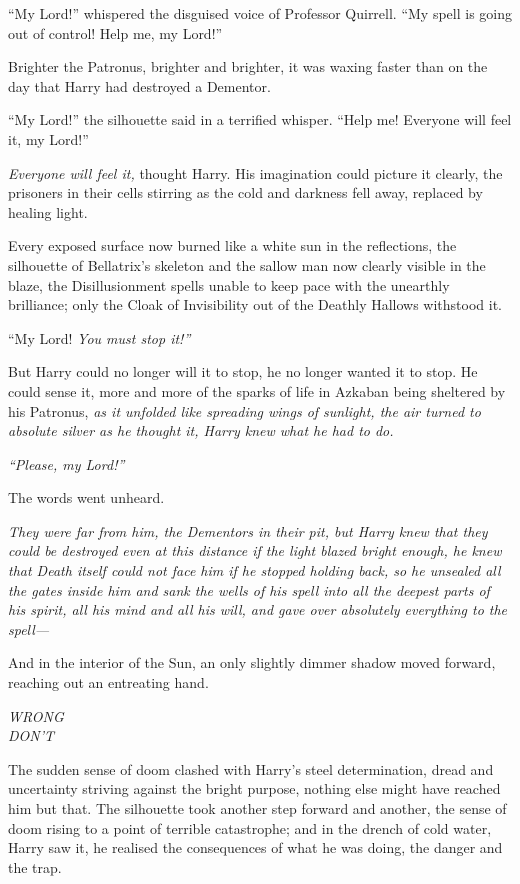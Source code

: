 ``My Lord!'' whispered the disguised voice of Professor Quirrell. ``My
spell is going out of control! Help me, my Lord!''

Brighter the Patronus, brighter and brighter, it was waxing faster than
on the day that Harry had destroyed a Dementor.

``My Lord!'' the silhouette said in a terrified whisper. ``Help me!
Everyone will feel it, my Lord!''

\emph{Everyone will feel it,} thought Harry. His imagination could
picture it clearly, the prisoners in their cells stirring as the cold
and darkness fell away, replaced by healing light.

Every exposed surface now burned like a white sun in the reflections,
the silhouette of Bellatrix's skeleton and the sallow man now clearly
visible in the blaze, the Disillusionment spells unable to keep pace
with the unearthly brilliance; only the Cloak of Invisibility out of the
Deathly Hallows withstood it.

``My Lord! \emph{You must stop it!''}

But Harry could no longer will it to stop, he no longer wanted it to
stop. He could sense it, more and more of the sparks of life in Azkaban
being sheltered by his Patronus, \emph{as it unfolded like spreading
wings of sunlight, the air turned to absolute silver as he thought it,
Harry knew what he had to do.}

\emph{``Please, my Lord!''}

The words went unheard.

\emph{They were far from him, the Dementors in their pit, but Harry knew
that they could be destroyed even at this distance if the light blazed
bright enough, he knew that Death itself could not face him if he
stopped holding back, so he unsealed all the gates inside him and sank
the wells of his spell into all the deepest parts of his spirit, all his
mind and all his will, and gave over absolutely everything to the
spell---}

And in the interior of the Sun, an only slightly dimmer shadow moved
forward, reaching out an entreating hand.

\emph{WRONG}\\\emph{DON'T}

The sudden sense of doom clashed with Harry's steel determination, dread
and uncertainty striving against the bright purpose, nothing else might
have reached him but that. The silhouette took another step forward and
another, the sense of doom rising to a point of terrible catastrophe;
and in the drench of cold water, Harry saw it, he realised the
consequences of what he was doing, the danger and the trap.

